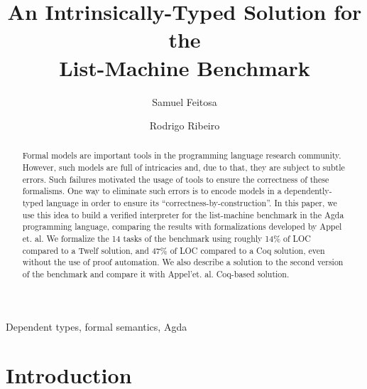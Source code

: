\documentclass[review]{elsarticle}
\theoremstyle{definition}
\begin{document}
\begin{frontmatter}

\title{An Intrinsically-Typed Solution for the\\ List-Machine Benchmark}

\author{Samuel Feitosa}
\address{%
  Departamento de Informática - Instituto Federal de Santa Catarina \\
  Caçador - Santa Catarina - Brazil
}

\author{Rodrigo Ribeiro}
\address{
  Prog. Pós Graduação em Ciência da Computação - Universidade Federal de Ouro Preto \\
  Ouro Preto - Minas Gerais - Brazil}



\begin{abstract}
Formal models are important tools in the programming language research
community. However, such models are full of intricacies and, due to that,
they are subject to subtle errors. Such failures motivated the usage of
tools to ensure the correctness of these formalisms. One way to eliminate
such errors is to encode models in a dependently-typed language in order
to ensure its ``correctness-by-construction''. In this paper, we use this
idea to build a verified interpreter for the list-machine benchmark in the
Agda programming language, comparing the results with formalizations developed
by Appel et. al. We formalize the 14 tasks of the benchmark
using roughly 14\% of LOC compared to a Twelf solution, and 47\% of LOC
compared to a Coq solution, even without the use of proof automation. We also
describe a solution to the second version of the benchmark and compare it with
Appel'et. al. Coq-based solution.
\end{abstract}


\begin{keyword}
Dependent types, formal semantics, Agda
\end{keyword}

\end{frontmatter}

\linenumbers






\section{Introduction}
\end{document}
